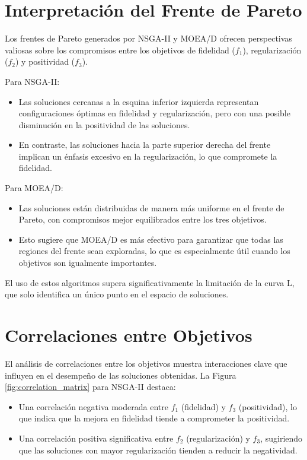 
\section{Interpretación del Frente de Pareto} \label{sec:analysis:pareto}

Los frentes de Pareto generados por NSGA-II y MOEA/D ofrecen perspectivas valiosas sobre los compromisos entre los objetivos de fidelidad (\( f_1 \)), regularización (\( f_2 \)) y positividad (\( f_3 \)). 

Para NSGA-II:
\begin{itemize}
    \item Las soluciones cercanas a la esquina inferior izquierda representan configuraciones óptimas en fidelidad y regularización, pero con una posible disminución en la positividad de las soluciones.
    \item En contraste, las soluciones hacia la parte superior derecha del frente implican un énfasis excesivo en la regularización, lo que compromete la fidelidad.
\end{itemize}

Para MOEA/D:
\begin{itemize}
    \item Las soluciones están distribuidas de manera más uniforme en el frente de Pareto, con compromisos mejor equilibrados entre los tres objetivos.
    \item Esto sugiere que MOEA/D es más efectivo para garantizar que todas las regiones del frente sean exploradas, lo que es especialmente útil cuando los objetivos son igualmente importantes.
\end{itemize}

El uso de estos algoritmos supera significativamente la limitación de la curva L, que solo identifica un único punto en el espacio de soluciones.

\section{Correlaciones entre Objetivos} \label{sec:analysis:correlations}

El análisis de correlaciones entre los objetivos muestra interacciones clave que influyen en el desempeño de las soluciones obtenidas. La Figura \ref{fig:correlation_matrix} para NSGA-II destaca:
\begin{itemize}
    \item Una correlación negativa moderada entre \( f_1 \) (fidelidad) y \( f_3 \) (positividad), lo que indica que la mejora en fidelidad tiende a comprometer la positividad.
    \item Una correlación positiva significativa entre \( f_2 \) (regularización) y \( f_3 \), sugiriendo que las soluciones con mayor regularización tienden a reducir la negatividad.
\end{itemize}

